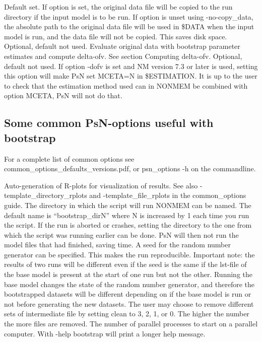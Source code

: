 \begin{optionlist}
\nextopt
{}
Default set. If option is set, the original data file
will be copied to the run directory if the input model is to be run.
If option is unset using -no-copy\_data, the absolute path to the original data file will be used in
\$DATA when the input model is run, and the data file will not be copied. This saves disk space.
\nextopt
{}
Optional, default not used. Evaluate original data with bootstrap parameter estimates and compute delta-ofv. See section Computing delta-ofv. 
\nextopt
{}
Optional, default not used. If option -dofv is set and NM version 7.3 or later is used, setting this option will make PsN set MCETA=N in \$ESTIMATION. It is up to the user to check that the estimation method used can in NONMEM be combined with option MCETA, PsN will not do that. 
\nextopt
\end{optionlist}


\subsection{Some common PsN-options useful with bootstrap}

For a complete list of common options see common\_options\_defaults\_versions.pdf, or psn\_options -h on the commandline.

\begin{optionlist}
Auto-generation of R-plots for visualization of results. See also -template\_directory\_rplots and -template\_file\_rplots in the common\_options guide.
\nextopt
{}
The directory in which the script will run NONMEM can be named. The default name is “bootstrap\_dirN” where N is increased by 1 each time you run the script. If the run is aborted or crashes, setting the directory to the one from which the script was running earlier can be done. PsN will then not run the model files that had finished, saving time. 
\nextopt
{}
A seed for the random number generator can be specified. This makes the run reproducible. Important note: the results of two runs will be different even if the seed is the same if the lst-file of the base model is present at the start of one run but not the other. Running the base model changes the state of the random number generator, and therefore the bootstrapped datasets will be different depending on if the base model is run or not before generating the  new datasets. 
\nextopt
{}
The user may choose to remove different sets of intermediate file by setting clean to 3, 2, 1, or 0. The higher the number the more files are removed. 
\nextopt
{}
The number of parallel processes to start on a parallel computer. 
\nextopt
{}
With -help bootstrap will print a longer help message. 
\nextopt
\end{optionlist}



